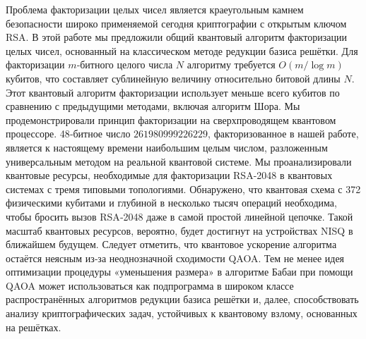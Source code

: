 \conclusion

Проблема факторизации целых чисел является краеугольным камнем безопасности
широко применяемой сегодня криптографии с открытым ключом RSA. В этой работе мы
предложили общий квантовый алгоритм факторизации целых чисел, основанный на
классическом методе редукции базиса решётки. Для факторизации $m$‑битного
целого числа $N$ алгоритму требуется $O(m/\log m)$ кубитов, что составляет
сублинейную величину относительно битовой длины $N$. Этот квантовый алгоритм
факторизации использует меньше всего кубитов по сравнению с предыдущими
методами, включая алгоритм Шора. Мы продемонстрировали принцип факторизации на
сверхпроводящем квантовом процессоре. 48‑битное число $261980999226229$,
факторизованное в нашей работе, является к настоящему времени наибольшим целым
числом, разложенным универсальным методом на реальной квантовой системе. Мы
проанализировали квантовые ресурсы, необходимые для факторизации RSA-2048 в
квантовых системах с тремя типовыми топологиями. Обнаружено, что квантовая
схема с 372 физическими кубитами и глубиной в несколько тысяч операций
необходима, чтобы бросить вызов RSA‑2048 даже в самой простой линейной цепочке.
Такой масштаб квантовых ресурсов, вероятно, будет достигнут на устройствах NISQ
в ближайшем будущем. Следует отметить, что квантовое ускорение алгоритма
остаётся неясным из‑за неоднозначной сходимости QAOA. Тем не менее идея
оптимизации процедуры «уменьшения размера» в алгоритме Бабаи при помощи QAOA
может использоваться как подпрограмма в широком классе распространённых
алгоритмов редукции базиса решётки и, далее, способствовать анализу
криптографических задач, устойчивых к квантовому взлому, основанных на
решётках.
